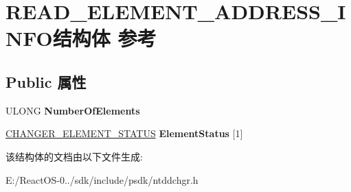 \hypertarget{struct_r_e_a_d___e_l_e_m_e_n_t___a_d_d_r_e_s_s___i_n_f_o}{}\section{R\+E\+A\+D\+\_\+\+E\+L\+E\+M\+E\+N\+T\+\_\+\+A\+D\+D\+R\+E\+S\+S\+\_\+\+I\+N\+F\+O结构体 参考}
\label{struct_r_e_a_d___e_l_e_m_e_n_t___a_d_d_r_e_s_s___i_n_f_o}
\subsection*{Public 属性}
\begin{DoxyCompactItemize}
\item 
\mbox{\label{struct_r_e_a_d___e_l_e_m_e_n_t___a_d_d_r_e_s_s___i_n_f_o_a5cfc1f3b9fd52fdc613c0f8b694f9dda}} 
U\+L\+O\+NG {\bfseries Number\+Of\+Elements}
\item 
\mbox{\label{struct_r_e_a_d___e_l_e_m_e_n_t___a_d_d_r_e_s_s___i_n_f_o_a10ba3da9ae3d250b7c0fb0c1c017be5f}} 
\hyperlink{struct___c_h_a_n_g_e_r___e_l_e_m_e_n_t___s_t_a_t_u_s}{C\+H\+A\+N\+G\+E\+R\+\_\+\+E\+L\+E\+M\+E\+N\+T\+\_\+\+S\+T\+A\+T\+US} {\bfseries Element\+Status} \mbox{[}1\mbox{]}
\end{DoxyCompactItemize}


该结构体的文档由以下文件生成\+:\begin{DoxyCompactItemize}
\item 
E\+:/\+React\+O\+S-\/0../sdk/include/psdk/ntddchgr.\+h\end{DoxyCompactItemize}
